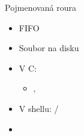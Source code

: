 \begin{frame}{Pojmenovaná roura}

  \begin{itemize}
    \item FIFO
    \item Soubor na disku

    \pause

    \item V C: 
    \begin{itemize}
      \item {}, 
    \end{itemize}

    \item V shellu: /

    \pause

    \item {}
  \end{itemize}

\end{frame}
